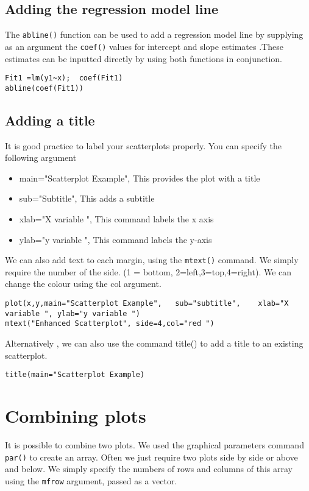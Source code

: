 \documentclass[a4paper,12pt]{article}
\begin{document}
\begin{itemize}
\subsection{Adding the regression model line}

The \texttt{abline()} function can be used to add a regression model line  by supplying as an argument the \texttt{coef()} values for intercept and slope estimates .These estimates can be inputted directly by using both functions in conjunction.

\footnotesize \begin{verbatim}
Fit1 =lm(y1~x);  coef(Fit1)
abline(coef(Fit1))	
\end{verbatim}\normalsize

\subsection{Adding a title }

It is good practice to label your scatterplots properly. You can specify the following argument
\begin{itemize}
\item	main="Scatterplot Example", 	This provides the plot with a title
\item	sub="Subtitle",                 This adds a subtitle
\item	xlab="X variable ",				This command labels the x axis 
\item   ylab="y variable ",				This command labels the y-axis
\end{itemize}
We can also add text to each margin, using the \texttt{mtext()} command.  
We simply require the number of the side. (1 = bottom, 2=left,3=top,4=right). 
We can change the colour using the col argument.
\footnotesize \begin{verbatim}
plot(x,y,main="Scatterplot Example",   sub="subtitle",    xlab="X variable ", ylab="y variable ")	
mtext("Enhanced Scatterplot", side=4,col="red ")
\end{verbatim}\normalsize
Alternatively , we can also use the command title() to add a title to an existing scatterplot.
\footnotesize \begin{verbatim}
title(main="Scatterplot Example)	
\end{verbatim}\normalsize


\section{Combining plots}
It is possible to combine two plots. We used the graphical parameters command \texttt{par()} to create an array. 
Often we just require two plots side by side or above and below. We simply specify the numbers of rows and columns of this array using the \texttt{mfrow} argument, passed as a vector.


\end{itemize}
\end{document}

